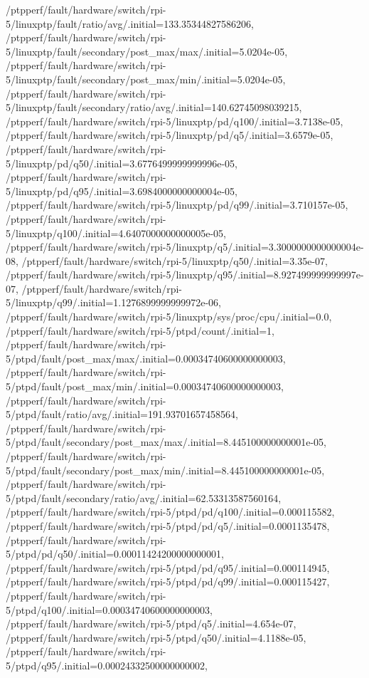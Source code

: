 {    /ptpperf/fault/hardware/switch/rpi-5/linuxptp/fault/ratio/avg/.initial=133.35344827586206,
    /ptpperf/fault/hardware/switch/rpi-5/linuxptp/fault/secondary/post_max/max/.initial=5.0204e-05,
    /ptpperf/fault/hardware/switch/rpi-5/linuxptp/fault/secondary/post_max/min/.initial=5.0204e-05,
    /ptpperf/fault/hardware/switch/rpi-5/linuxptp/fault/secondary/ratio/avg/.initial=140.62745098039215,
    /ptpperf/fault/hardware/switch/rpi-5/linuxptp/pd/q100/.initial=3.7138e-05,
    /ptpperf/fault/hardware/switch/rpi-5/linuxptp/pd/q5/.initial=3.6579e-05,
    /ptpperf/fault/hardware/switch/rpi-5/linuxptp/pd/q50/.initial=3.6776499999999996e-05,
    /ptpperf/fault/hardware/switch/rpi-5/linuxptp/pd/q95/.initial=3.6984000000000004e-05,
    /ptpperf/fault/hardware/switch/rpi-5/linuxptp/pd/q99/.initial=3.710157e-05,
    /ptpperf/fault/hardware/switch/rpi-5/linuxptp/q100/.initial=4.6407000000000005e-05,
    /ptpperf/fault/hardware/switch/rpi-5/linuxptp/q5/.initial=3.3000000000000004e-08,
    /ptpperf/fault/hardware/switch/rpi-5/linuxptp/q50/.initial=3.35e-07,
    /ptpperf/fault/hardware/switch/rpi-5/linuxptp/q95/.initial=8.927499999999997e-07,
    /ptpperf/fault/hardware/switch/rpi-5/linuxptp/q99/.initial=1.1276899999999972e-06,
    /ptpperf/fault/hardware/switch/rpi-5/linuxptp/sys/proc/cpu/.initial=0.0,
    /ptpperf/fault/hardware/switch/rpi-5/ptpd/count/.initial=1,
    /ptpperf/fault/hardware/switch/rpi-5/ptpd/fault/post_max/max/.initial=0.00034740600000000003,
    /ptpperf/fault/hardware/switch/rpi-5/ptpd/fault/post_max/min/.initial=0.00034740600000000003,
    /ptpperf/fault/hardware/switch/rpi-5/ptpd/fault/ratio/avg/.initial=191.93701657458564,
    /ptpperf/fault/hardware/switch/rpi-5/ptpd/fault/secondary/post_max/max/.initial=8.445100000000001e-05,
    /ptpperf/fault/hardware/switch/rpi-5/ptpd/fault/secondary/post_max/min/.initial=8.445100000000001e-05,
    /ptpperf/fault/hardware/switch/rpi-5/ptpd/fault/secondary/ratio/avg/.initial=62.53313587560164,
    /ptpperf/fault/hardware/switch/rpi-5/ptpd/pd/q100/.initial=0.000115582,
    /ptpperf/fault/hardware/switch/rpi-5/ptpd/pd/q5/.initial=0.0001135478,
    /ptpperf/fault/hardware/switch/rpi-5/ptpd/pd/q50/.initial=0.00011424200000000001,
    /ptpperf/fault/hardware/switch/rpi-5/ptpd/pd/q95/.initial=0.000114945,
    /ptpperf/fault/hardware/switch/rpi-5/ptpd/pd/q99/.initial=0.000115427,
    /ptpperf/fault/hardware/switch/rpi-5/ptpd/q100/.initial=0.00034740600000000003,
    /ptpperf/fault/hardware/switch/rpi-5/ptpd/q5/.initial=4.654e-07,
    /ptpperf/fault/hardware/switch/rpi-5/ptpd/q50/.initial=4.1188e-05,
    /ptpperf/fault/hardware/switch/rpi-5/ptpd/q95/.initial=0.00024332500000000002,
}

